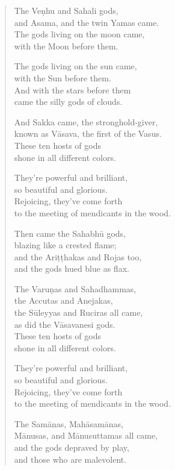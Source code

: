 \documentclass[12pt,openany]{book}%
\begin{document}
\begin{verse}
The \textsanskrit{Veṇhu} and Sahali gods, \\
and Asama, and the twin Yamas came. \\
The gods living on the moon came, \\
with the Moon before them. 

The gods living on the sun came, \\
with the Sun before them. \\
And with the stars before them \\
came the silly gods of clouds. 

And Sakka came, the stronghold-giver, \\
known as \textsanskrit{Vāsava}, the first of the Vasus. \\
These ten hosts of gods \\
shone in all different colors. 

They’re powerful and brilliant, \\
so beautiful and glorious. \\
Rejoicing, they’ve come forth \\
to the meeting of mendicants in the wood. 

Then came the \textsanskrit{Sahabhū} gods, \\
blazing like a crested flame; \\
and the \textsanskrit{Ariṭṭhakas} and Rojas too, \\
and the gods hued blue as flax. 

The \textsanskrit{Varuṇas} and Sahadhammas, \\
the Accutas and Anejakas, \\
the \textsanskrit{Sūleyyas} and Ruciras all came, \\
as did the \textsanskrit{Vāsavanesi} gods. \\
These ten hosts of gods \\
shone in all different colors. 

They’re powerful and brilliant, \\
so beautiful and glorious. \\
Rejoicing, they’ve come forth \\
to the meeting of mendicants in the wood. 

The \textsanskrit{Samānas}, \textsanskrit{Mahāsamānas}, \\
\textsanskrit{Mānusas}, and \textsanskrit{Mānusuttamas} all came, \\
and the gods depraved by play, \\
and those who are malevolent. 


\end{verse}
\end{document}
